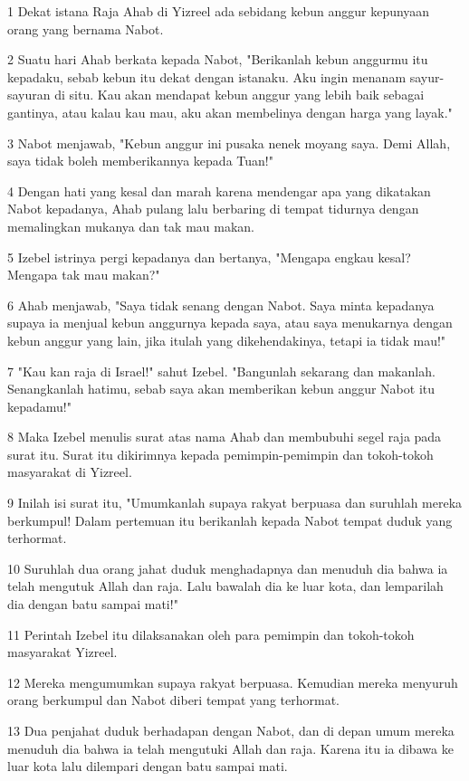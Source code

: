 \par 1 Dekat istana Raja Ahab di Yizreel ada sebidang kebun anggur kepunyaan orang yang bernama Nabot.
\par 2 Suatu hari Ahab berkata kepada Nabot, "Berikanlah kebun anggurmu itu kepadaku, sebab kebun itu dekat dengan istanaku. Aku ingin menanam sayur-sayuran di situ. Kau akan mendapat kebun anggur yang lebih baik sebagai gantinya, atau kalau kau mau, aku akan membelinya dengan harga yang layak."
\par 3 Nabot menjawab, "Kebun anggur ini pusaka nenek moyang saya. Demi Allah, saya tidak boleh memberikannya kepada Tuan!"
\par 4 Dengan hati yang kesal dan marah karena mendengar apa yang dikatakan Nabot kepadanya, Ahab pulang lalu berbaring di tempat tidurnya dengan memalingkan mukanya dan tak mau makan.
\par 5 Izebel istrinya pergi kepadanya dan bertanya, "Mengapa engkau kesal? Mengapa tak mau makan?"
\par 6 Ahab menjawab, "Saya tidak senang dengan Nabot. Saya minta kepadanya supaya ia menjual kebun anggurnya kepada saya, atau saya menukarnya dengan kebun anggur yang lain, jika itulah yang dikehendakinya, tetapi ia tidak mau!"
\par 7 "Kau kan raja di Israel!" sahut Izebel. "Bangunlah sekarang dan makanlah. Senangkanlah hatimu, sebab saya akan memberikan kebun anggur Nabot itu kepadamu!"
\par 8 Maka Izebel menulis surat atas nama Ahab dan membubuhi segel raja pada surat itu. Surat itu dikirimnya kepada pemimpin-pemimpin dan tokoh-tokoh masyarakat di Yizreel.
\par 9 Inilah isi surat itu, "Umumkanlah supaya rakyat berpuasa dan suruhlah mereka berkumpul! Dalam pertemuan itu berikanlah kepada Nabot tempat duduk yang terhormat.
\par 10 Suruhlah dua orang jahat duduk menghadapnya dan menuduh dia bahwa ia telah mengutuk Allah dan raja. Lalu bawalah dia ke luar kota, dan lemparilah dia dengan batu sampai mati!"
\par 11 Perintah Izebel itu dilaksanakan oleh para pemimpin dan tokoh-tokoh masyarakat Yizreel.
\par 12 Mereka mengumumkan supaya rakyat berpuasa. Kemudian mereka menyuruh orang berkumpul dan Nabot diberi tempat yang terhormat.
\par 13 Dua penjahat duduk berhadapan dengan Nabot, dan di depan umum mereka menuduh dia bahwa ia telah mengutuki Allah dan raja. Karena itu ia dibawa ke luar kota lalu dilempari dengan batu sampai mati.
